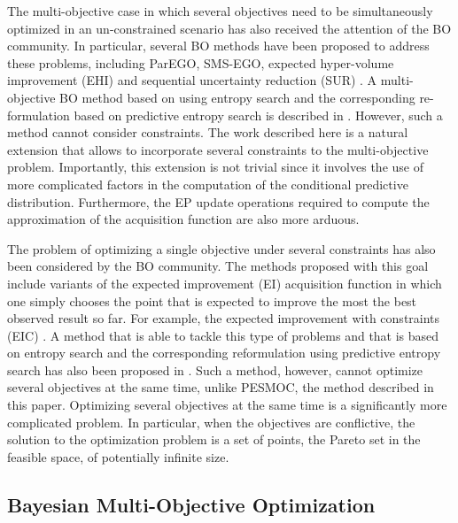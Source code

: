 \documentclass[review,preprint,12pt]{elsarticle}
\begin{document}
The multi-objective case in which several objectives need to be simultaneously optimized in 
an un-constrained scenario has also received the attention of the BO community. In particular, several BO methods have been 
proposed to address these problems, including ParEGO, SMS-EGO, expected hyper-volume improvement 
(EHI) and sequential uncertainty reduction (SUR) 
\citep{knowles2006parego,ponweiser2008multiobjective,emmerich2008computation,picheny2015multiobjective}.
A multi-objective BO method based on using entropy search and the corresponding re-formulation 
based on predictive entropy search is described in \citep{hernandez2016predictive}. However, such a 
method cannot consider constraints. The work described here is a natural extension that allows to 
incorporate several constraints to the multi-objective problem. Importantly, this extension is not 
trivial since it involves the use of more complicated factors in the computation of the conditional 
predictive distribution. Furthermore, the EP update operations required to compute the approximation 
of the acquisition function are also more arduous.

The problem of optimizing a single objective under several constraints has also been considered
by the BO community. The methods proposed with this goal include variants of the expected improvement (EI)
acquisition function in which one simply chooses the point that is expected to improve the most the best observed 
result so far. For example, the expected improvement with constraints (EIC) \citep{Schonlau98,parr2013,snoek2013,
gardner2014bayesian,gelbart2014bayesian}. A method that is able to tackle this type of problems and that 
is based on entropy search and the corresponding reformulation using predictive entropy search has also 
been proposed in \citep{hernandez2015predictive,hernandez2016general}. Such a method, however, cannot optimize
several objectives at the same time, unlike PESMOC, the method described in this paper. Optimizing several objectives 
at the same time is a significantly more complicated problem. In particular, when the objectives are conflictive, 
the solution to the optimization problem is a set of points, the Pareto set in the feasible space, of potentially 
infinite size.

\subsection{Bayesian Multi-Objective Optimization}
\end{document}

